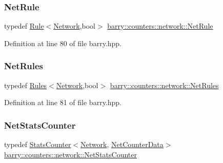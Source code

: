 \subsubsection{\texorpdfstring{Net\+Rule}{NetRule}}
{\footnotesize\ttfamily typedef \hyperlink{classbarry_1_1_rule}{Rule}$<$\hyperlink{namespacebarry_1_1counters_1_1network_a4cb88d4572ded3b447ea269c9cd0b2c0}{Network},bool$>$ \hyperlink{namespacebarry_1_1counters_1_1network_afbd2c2a61931e69dd5f668c421e87a6f}{barry\+::counters\+::network\+::\+Net\+Rule}}



Definition at line 80 of file barry.\+hpp.

\mbox{\label{namespacebarry_1_1counters_1_1network_adbdb20b3ce883777da2364984ea10c56}} 
\subsubsection{\texorpdfstring{Net\+Rules}{NetRules}}
{\footnotesize\ttfamily typedef \hyperlink{classbarry_1_1_rules}{Rules}$<$\hyperlink{namespacebarry_1_1counters_1_1network_a4cb88d4572ded3b447ea269c9cd0b2c0}{Network},bool$>$ \hyperlink{namespacebarry_1_1counters_1_1network_adbdb20b3ce883777da2364984ea10c56}{barry\+::counters\+::network\+::\+Net\+Rules}}



Definition at line 81 of file barry.\+hpp.

\mbox{\label{namespacebarry_1_1counters_1_1network_ae26c399917113fe280b3f2859376b8b9}} 
\subsubsection{\texorpdfstring{Net\+Stats\+Counter}{NetStatsCounter}}
{\footnotesize\ttfamily typedef \hyperlink{classbarry_1_1_stats_counter}{Stats\+Counter}$<$\hyperlink{namespacebarry_1_1counters_1_1network_a4cb88d4572ded3b447ea269c9cd0b2c0}{Network}, \hyperlink{classbarry_1_1counters_1_1network_1_1_net_counter_data}{Net\+Counter\+Data}$>$ \hyperlink{namespacebarry_1_1counters_1_1network_ae26c399917113fe280b3f2859376b8b9}{barry\+::counters\+::network\+::\+Net\+Stats\+Counter}}



